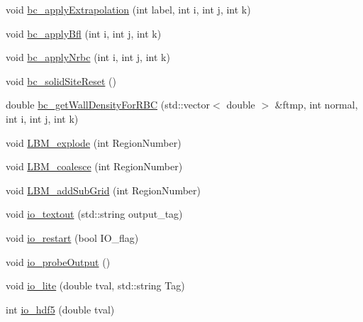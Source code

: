 \begin{DoxyCompactItemize}
\item 
void \hyperlink{class_grid_obj_a385c4803f4803e380a520ac9b3dcb31d}{bc\+\_\+apply\+Extrapolation} (int label, int i, int j, int k)
\item 
void \hyperlink{class_grid_obj_aeff3b54617b7ae65f08c96e653f9035f}{bc\+\_\+apply\+Bfl} (int i, int j, int k)
\item 
void \hyperlink{class_grid_obj_ae4fd999e7334c8ec8e1118c92e0c7338}{bc\+\_\+apply\+Nrbc} (int i, int j, int k)
\item 
void \hyperlink{class_grid_obj_ac86a233f9475084226e6bf651ffe398f}{bc\+\_\+solid\+Site\+Reset} ()
\item 
double \hyperlink{class_grid_obj_a8780d80f2868e9444349e518bd40a198}{bc\+\_\+get\+Wall\+Density\+For\+R\+BC} (std\+::vector$<$ double $>$ \&ftmp, int normal, int i, int j, int k)
\item 
void \hyperlink{class_grid_obj_ad8086651bd7b978e0b9c48d56c3d0595}{L\+B\+M\+\_\+explode} (int Region\+Number)
\item 
void \hyperlink{class_grid_obj_a5832081a70e8990be62317034bb975c6}{L\+B\+M\+\_\+coalesce} (int Region\+Number)
\item 
void \hyperlink{class_grid_obj_ab0d47be7ccafaa84b5d43da69e2082b9}{L\+B\+M\+\_\+add\+Sub\+Grid} (int Region\+Number)
\item 
void \hyperlink{class_grid_obj_a1f334215b7789ea1ad8e2d1e15c67fb2}{io\+\_\+textout} (std\+::string output\+\_\+tag)
\item 
void \hyperlink{class_grid_obj_a940b825873a33b2fc9375f7a8f9bffc7}{io\+\_\+restart} (bool I\+O\+\_\+flag)
\item 
void \hyperlink{class_grid_obj_af7e8782f95d15884d761cc4f1d5926c0}{io\+\_\+probe\+Output} ()
\item 
void \hyperlink{class_grid_obj_acf311bbf350fd48104663eaabebca835}{io\+\_\+lite} (double tval, std\+::string Tag)
\item 
int \hyperlink{class_grid_obj_adc960ac818748b839e81d1375782caa7}{io\+\_\+hdf5} (double tval)
\end{DoxyCompactItemize}
